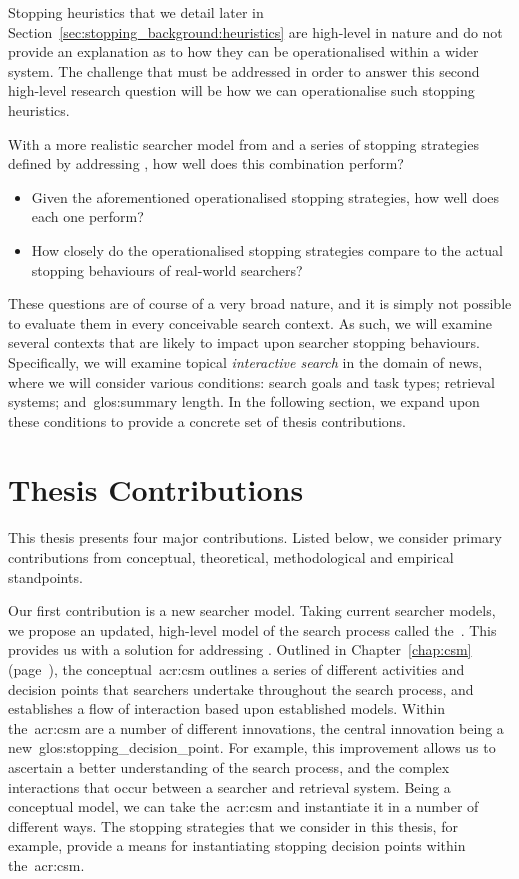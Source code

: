 Stopping heuristics that we detail later in Section~\ref{sec:stopping_background:heuristics} are high-level in nature and do not provide an explanation as to how they can be operationalised within a wider system. The challenge that must be addressed in order to answer this second high-level research question will be how we can operationalise such stopping heuristics.

With a more realistic searcher model from  and a series of stopping strategies defined by addressing , how well does this combination perform?

\begin{itemize}
    \item{ Given the aforementioned operationalised stopping strategies, how well does each one perform?}
    \item{ How closely do the operationalised stopping strategies compare to the actual stopping behaviours of real-world searchers?}
\end{itemize}

These questions are of course of a very broad nature, and it is simply not possible to evaluate them in every conceivable search context. As such, we will examine several contexts that are likely to impact upon searcher stopping behaviours. Specifically, we will examine topical \emph{interactive search} in the domain of news, where we will consider various conditions: search goals and task types; retrieval systems; and~\gls{glos:summary} length. In the following section, we expand upon these conditions to provide a concrete set of thesis contributions.

\section{Thesis Contributions}\label{sec:intro:contribs}
This thesis presents four major contributions. Listed below, we consider primary contributions from conceptual, theoretical, methodological and empirical standpoints.

\noindent
{} Our first contribution is a new searcher model. Taking current searcher models, we propose an updated, high-level model of the search process called the~. This provides us with a solution for addressing . Outlined in Chapter~\ref{chap:csm} (page~\pageref{chap:csm}), the conceptual~\gls{acr:csm} outlines a series of different activities and decision points that searchers undertake throughout the search process, and establishes a flow of interaction based upon established models. Within the~\gls{acr:csm} are a number of different innovations, the central innovation being a new~\gls{glos:stopping_decision_point}. For example, this improvement allows us to ascertain a better understanding of the search process, and the complex interactions that occur between a searcher and retrieval system. Being a conceptual model, we can take the~\gls{acr:csm} and instantiate it in a number of different ways. The stopping strategies that we consider in this thesis, for example, provide a means for instantiating stopping decision points within the~\gls{acr:csm}.

